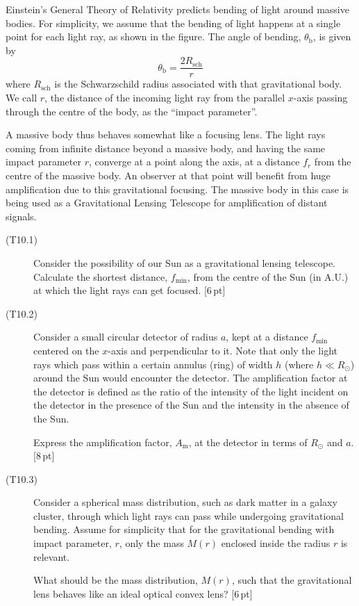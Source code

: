 Einstein's General Theory of Relativity predicts bending of light around
massive bodies. For simplicity, we assume that the bending of light happens at
a single point for each light ray, as shown in the figure. The angle of
bending, $\theta_{\mathrm{b}}$, is given by
\[ \theta_{\mathrm{b}} = \frac{2R_{\mathrm{sch}}}{r} \]
where $R_{\mathrm{sch}}$ is the Schwarzschild radius associated with that
gravitational body. We call $r$, the distance of the incoming light ray from
the parallel $x$-axis passing through the centre of the body, as the ``impact
parameter''.


A massive body thus behaves somewhat like a focusing lens. The light rays
coming from infinite distance beyond a massive body, and having the same
impact parameter $r$, converge at a point along the axis, at a distance $f_r$
from the centre of the massive body. An observer at that point will benefit
from huge amplification due to this gravitational focusing. The massive body
in this case is being used as a Gravitational Lensing Telescope for
amplification of distant signals.

\begin{description}
\item[(T10.1)] Consider the possibility of our Sun as a gravitational lensing
  telescope. Calculate the shortest distance, $f_{\mathrm{min}}$, from the
  centre of the Sun (in A.U.) at which the light rays can get focused.
  \hfill[6\,pt]
\item[(T10.2)] Consider a small circular detector of radius $a$, kept at a
  distance $f_{\mathrm{min}}$ centered on the $x$-axis and perpendicular to
  it. Note that only the light rays which pass within a certain annulus (ring)
  of width $h$ (where $h \ll R_\odot$) around the Sun would encounter the
  detector. The amplification factor at the detector is defined as the ratio
  of the intensity of the light incident on the detector in the presence of
  the Sun and the intensity in the absence of the Sun.

  Express the amplification factor, $A_{\mathrm{m}}$, at the detector in terms
  of $R_\odot$ and $a$. \hfill[8\,pt]
\item[(T10.3)] Consider a spherical mass distribution, such as dark matter in
  a galaxy cluster, through which light rays can pass while undergoing
  gravitational bending. Assume for simplicity that for the gravitational
  bending with impact parameter, $r$, only the mass $M(r)$ enclosed inside the
  radius $r$ is relevant.

  What should be the mass distribution, $M(r)$, such that the gravitational
  lens behaves like an ideal optical convex lens? \hfill[6\,pt]
\end{description}
